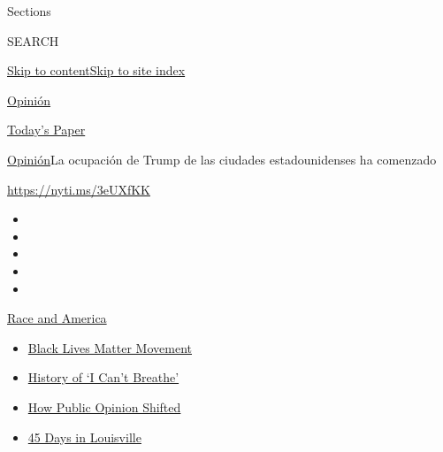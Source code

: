 Sections

SEARCH

\protect\hyperlink{site-content}{Skip to
content}\protect\hyperlink{site-index}{Skip to site index}

\href{https://www.nytimes.com/es/section/opinion}{Opinión}

\href{https://myaccount.nytimes.com/auth/login?response_type=cookie\&client_id=vi}{}

\href{https://www.nytimes.com/section/todayspaper}{Today's Paper}

\href{/es/section/opinion}{Opinión}\textbar{}La ocupación de Trump de
las ciudades estadounidenses ha comenzado

\href{https://nyti.ms/3eUXfKK}{https://nyti.ms/3eUXfKK}

\begin{itemize}
\item
\item
\item
\item
\item
\end{itemize}

\href{https://www.nytimes.com/news-event/george-floyd-protests-minneapolis-new-york-los-angeles?action=click\&pgtype=Article\&state=default\&region=TOP_BANNER\&context=storylines_menu}{Race
and America}

\begin{itemize}
\tightlist
\item
  \href{https://www.nytimes.com/interactive/2020/07/03/us/george-floyd-protests-crowd-size.html?action=click\&pgtype=Article\&state=default\&region=TOP_BANNER\&context=storylines_menu}{Black
  Lives Matter Movement}
\item
  \href{https://www.nytimes.com/interactive/2020/06/28/us/i-cant-breathe-police-arrest.html?action=click\&pgtype=Article\&state=default\&region=TOP_BANNER\&context=storylines_menu}{History
  of `I Can't Breathe'}
\item
  \href{https://www.nytimes.com/interactive/2020/06/10/upshot/black-lives-matter-attitudes.html?action=click\&pgtype=Article\&state=default\&region=TOP_BANNER\&context=storylines_menu}{How
  Public Opinion Shifted}
\item
  \href{https://www.nytimes.com/interactive/2020/07/16/us/black-lives-matter-protests-louisville-breonna-taylor.html?action=click\&pgtype=Article\&state=default\&region=TOP_BANNER\&context=storylines_menu}{45
  Days in Louisville}
\end{itemize}

